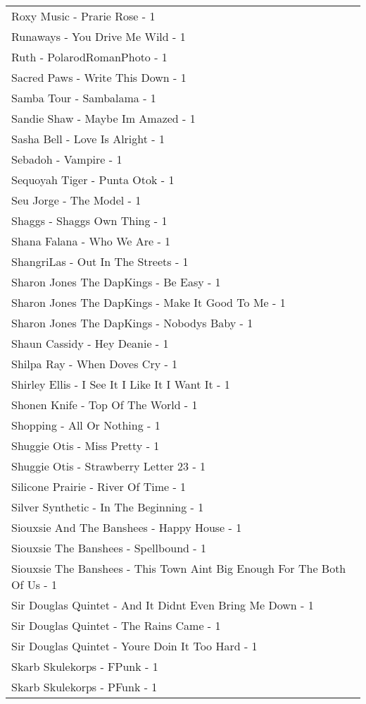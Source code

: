 \documentclass[
]{article}
\begin{document}
\begin{longtable}{l}
Roxy Music - Prarie Rose - 1 \\ 
Runaways - You Drive Me Wild - 1 \\ 
Ruth - PolarodRomanPhoto - 1 \\ 
Sacred Paws - Write This Down - 1 \\ 
Samba Tour - Sambalama - 1 \\ 
Sandie Shaw - Maybe Im Amazed - 1 \\ 
Sasha Bell - Love Is Alright - 1 \\ 
Sebadoh - Vampire - 1 \\ 
Sequoyah Tiger - Punta Otok - 1 \\ 
Seu Jorge - The Model - 1 \\ 
Shaggs - Shaggs Own Thing - 1 \\ 
Shana Falana - Who We Are - 1 \\ 
ShangriLas - Out In The Streets - 1 \\ 
Sharon Jones The DapKings - Be Easy - 1 \\ 
Sharon Jones The DapKings - Make It Good To Me - 1 \\ 
Sharon Jones The DapKings - Nobodys Baby - 1 \\ 
Shaun Cassidy - Hey Deanie - 1 \\ 
Shilpa Ray - When Doves Cry - 1 \\ 
Shirley Ellis - I See It I Like It I Want It - 1 \\ 
Shonen Knife - Top Of The World - 1 \\ 
Shopping - All Or Nothing - 1 \\ 
Shuggie Otis - Miss Pretty - 1 \\ 
Shuggie Otis - Strawberry Letter 23 - 1 \\ 
Silicone Prairie - River Of Time - 1 \\ 
Silver Synthetic - In The Beginning - 1 \\ 
Siouxsie And The Banshees - Happy House - 1 \\ 
Siouxsie The Banshees - Spellbound - 1 \\ 
Siouxsie The Banshees - This Town Aint Big Enough For The Both Of Us - 1 \\ 
Sir Douglas Quintet - And It Didnt Even Bring Me Down - 1 \\ 
Sir Douglas Quintet - The Rains Came - 1 \\ 
Sir Douglas Quintet - Youre Doin It Too Hard - 1 \\ 
Skarb Skulekorps - FPunk - 1 \\ 
Skarb Skulekorps - PFunk - 1 \\ 

\end{longtable}
\end{document}

